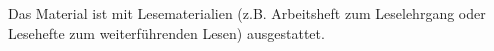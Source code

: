 Das Material ist mit Lesematerialien (z.B. Arbeitsheft zum Leselehrgang oder Lesehefte zum weiterführenden Lesen) ausgestattet.